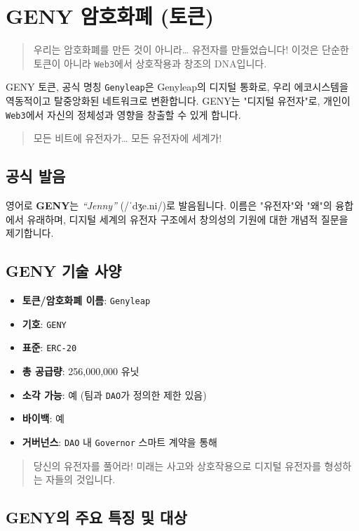 \documentclass[a4paper,12pt,openany]{book}
\begin{document}
\chapter{GENY 암호화폐 (토큰)}
\begin{quote}
우리는 암호화폐를 만든 것이 아니라… 유전자를 만들었습니다! 이것은 단순한 토큰이 아니라 \texttt{Web3}에서 상호작용과 창조의 DNA입니다.
\end{quote}
GENY 토큰, 공식 명칭 \texttt{Genyleap}은 Genyleap의 디지털 통화로, 우리 에코시스템을 역동적이고 탈중앙화된 네트워크로 변환합니다. GENY는 "디지털 유전자"로, 개인이 \texttt{Web3}에서 자신의 정체성과 영향을 창출할 수 있게 합니다.
\begin{quote}
모든 비트에 유전자가… 모든 유전자에 세계가!
\end{quote}

\section*{공식 발음}
영어로 \textbf{GENY}는 \textit{``Jenny''} ({\ipafont /ˈdʒe.ni/})로 발음됩니다. 이름은 "유전자"와 "왜"의 융합에서 유래하며, 디지털 세계의 유전자 구조에서 창의성의 기원에 대한 개념적 질문을 제기합니다.

\section*{GENY 기술 사양}
\begin{itemize}
    \item \textbf{토큰/암호화폐 이름}: \texttt{Genyleap}
    \item \textbf{기호}: \texttt{GENY}
    \item \textbf{표준}: \texttt{ERC-20}
    \item \textbf{총 공급량}: 256,000,000 유닛
    \item \textbf{소각 가능}: 예 (팀과 \texttt{DAO}가 정의한 제한 있음)
    \item \textbf{바이백}: 예
    \item \textbf{거버넌스}: \texttt{DAO} 내 \texttt{Governor} 스마트 계약을 통해
\end{itemize}
\vspace{-0.5em}
\begin{quote}
당신의 유전자를 풀어라! 미래는 사고와 상호작용으로 디지털 유전자를 형성하는 자들의 것입니다.
\end{quote}
\newpage

\section*{GENY의 주요 특징 및 대상}
\end{document}
